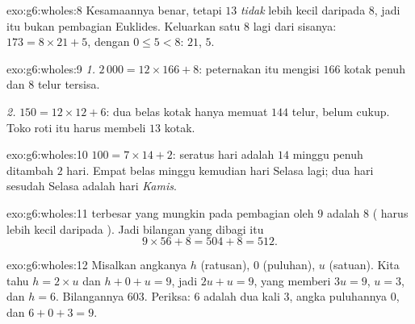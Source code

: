 \begin{solution}{exo:g6:wholes:8}
Kesamaannya benar, tetapi  $13$ \emph{tidak} lebih kecil daripada
 $8$, jadi itu bukan pembagian Euklides. Keluarkan satu $8$
lagi dari sisanya: $173 = 8 \times 21 + 5$, dengan $0 \leq 5 < 8$:
 $21$,  $5$.
\end{solution}

\begin{solution}{exo:g6:wholes:9}
\emph{1.} $2\,000 = 12 \times 166 + 8$: peternakan itu mengisi $166$
kotak penuh dan $8$ telur tersisa.

\emph{2.} $150 = 12 \times 12 + 6$: dua belas kotak hanya memuat $144$
telur, belum cukup. Toko roti itu harus membeli $13$ kotak.
\end{solution}

\begin{solution}{exo:g6:wholes:10}
$100 = 7 \times 14 + 2$: seratus hari adalah $14$ minggu penuh
ditambah $2$ hari. Empat belas minggu kemudian hari Selasa lagi; dua
hari sesudah Selasa adalah hari \emph{Kamis}.
\end{solution}

\begin{solution}{exo:g6:wholes:11}
 terbesar yang mungkin pada pembagian oleh $9$ adalah $8$ (
harus lebih kecil daripada ). Jadi bilangan yang dibagi itu
\[
9 \times 56 + 8 = 504 + 8 = 512 .
\]
\end{solution}

\begin{solution}{exo:g6:wholes:12}
Misalkan angkanya $h$ (ratusan), $0$ (puluhan), $u$ (satuan). Kita
tahu $h = 2 \times u$ dan $h + 0 + u = 9$, jadi $2u + u = 9$, yang
memberi $3u = 9$, $u = 3$, dan $h = 6$. Bilangannya $603$. Periksa:
$6$ adalah dua kali $3$, angka puluhannya $0$, dan $6 + 0 + 3 = 9$.
\end{solution}

